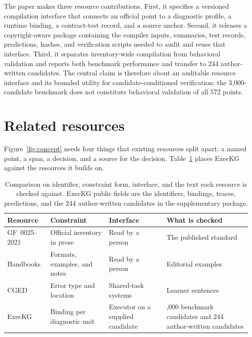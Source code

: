 \documentclass[pdflatex,sn-mathphys,NameDate]{sn-jnl}
\begin{document}
The paper makes three resource contributions.
First, it specifies a versioned compilation interface that connects an official point to a diagnostic profile, a runtime binding, a contract-test record, and a source anchor.
Second, it releases a copyright-aware package containing the compiler inputs, summaries, test records, predictions, hashes, and verification scripts needed to audit and reuse that interface.
Third, it separates inventory-wide compilation from behavioral validation and reports both benchmark performance and transfer to 244 author-written candidates.
The central claim is therefore about an auditable resource interface and its bounded utility for candidate-conditioned verification; the 3,000-candidate benchmark does not constitute behavioral validation of all 572 points.

\section{Related resources}
\label{sec:related}

Figure~\ref{fig:concept} needs four things that existing resources split apart: a named point, a span, a decision, and a source for the decision.
Table~\ref{tab:compare} places ExecKG against the resources it builds on.

\begin{table}[!ht]
\centering
\small
{}
\begin{tabularx}{\textwidth}{@{}>{\raggedright\arraybackslash}p{}>{\raggedright\arraybackslash}X>{\raggedright\arraybackslash}X>{\raggedright\arraybackslash}X@{}}
\toprule
Resource & Constraint & Interface & What is checked \\
\midrule
GF~0025--2021 & Official inventory in prose & Read by a person & The published standard \\
Handbooks & Formats, examples, and notes & Read by a person & Editorial examples \\
CGED & Error type and location & Shared-task systems & Learner sentences \\
ExecKG & Binding per diagnostic unit & Executor on a supplied candidate & 3,000 benchmark candidates and 244 author-written candidates \\
\bottomrule
\end{tabularx}
\caption{Comparison on identifier, constraint form, interface, and the text each resource is checked against. ExecKG public fields are the identifiers, bindings, traces, predictions, and the 244 author-written candidates in the supplementary package.}
\label{tab:compare}
\end{table}
\end{document}
